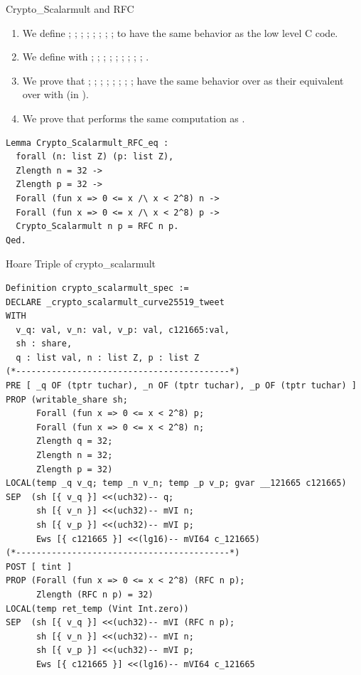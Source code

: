 \documentclass[8pt,aspectratio=169]{beamer}
\begin{document}
%
%
\begin{frame}[fragile]{Crypto\_Scalarmult and RFC}

\begin{enumerate}
  \item We define ; ; ; ; ; ; ;
  ;  to have the same behavior as the low level C code.
  \item We define  with ; ; ; ; ; ; ;
  ; ; .
  \item We prove that ; ; ; ;
  ; ; ; ;  have the same behavior over 
  as their equivalent over  with  (in \Zfield).
  \item We prove that  performs the same computation as .
\end{enumerate}

\begin{lstlisting}[language=Coq, basicstyle=\normalsize]
Lemma Crypto_Scalarmult_RFC_eq :
  forall (n: list Z) (p: list Z),
  Zlength n = 32 ->
  Zlength p = 32 ->
  Forall (fun x => 0 <= x /\ x < 2^8) n ->
  Forall (fun x => 0 <= x /\ x < 2^8) p ->
  Crypto_Scalarmult n p = RFC n p.
Qed.
\end{lstlisting}

\end{frame}


%
%
\begin{frame}[fragile]{Hoare Triple of crypto\_scalarmult}
\begin{lstlisting}[language=CoqVST]
Definition crypto_scalarmult_spec :=
DECLARE _crypto_scalarmult_curve25519_tweet
WITH
  v_q: val, v_n: val, v_p: val, c121665:val,
  sh : share,
  q : list val, n : list Z, p : list Z
(*------------------------------------------*)
PRE [ _q OF (tptr tuchar), _n OF (tptr tuchar), _p OF (tptr tuchar) ]
PROP (writable_share sh;
      Forall (fun x => 0 <= x < 2^8) p;
      Forall (fun x => 0 <= x < 2^8) n;
      Zlength q = 32;
      Zlength n = 32;
      Zlength p = 32)
LOCAL(temp _q v_q; temp _n v_n; temp _p v_p; gvar __121665 c121665)
SEP  (sh [{ v_q }] <<(uch32)-- q;
      sh [{ v_n }] <<(uch32)-- mVI n;
      sh [{ v_p }] <<(uch32)-- mVI p;
      Ews [{ c121665 }] <<(lg16)-- mVI64 c_121665)
(*------------------------------------------*)
POST [ tint ]
PROP (Forall (fun x => 0 <= x < 2^8) (RFC n p);
      Zlength (RFC n p) = 32)
LOCAL(temp ret_temp (Vint Int.zero))
SEP  (sh [{ v_q }] <<(uch32)-- mVI (RFC n p);
      sh [{ v_n }] <<(uch32)-- mVI n;
      sh [{ v_p }] <<(uch32)-- mVI p;
      Ews [{ c121665 }] <<(lg16)-- mVI64 c_121665
\end{lstlisting}
\end{frame}
\end{document}
